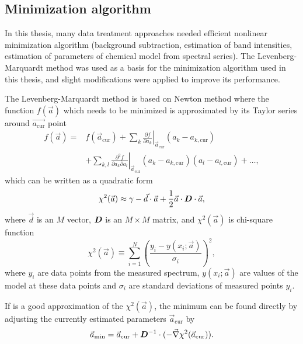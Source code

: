\subsection{Minimization algorithm}
\label{minimization}

In this thesis, many data treatment approaches needed efficient nonlinear
minimization algorithm (background subtraction, estimation of band intensities,
estimation of parameters of chemical model from spectral series).
The Levenberg-Marquardt method
\parencite{Marquardt1963}
was used as a basis for the minimization algorithm used in this thesis, and
slight modifications were applied to improve its performance.

The Levenberg-Marquardt method is based on Newton method where
the function $f(\vec{a})$ which needs to be minimized is approximated by its
Taylor series around $\vec{a_\text{cur}}$ point
\begin{align*}
	f(\vec{a}) =& f(\vec{a}_\text{cur})
		+ \sum_k \left.\frac{\partial{}f}{\partial{}a_k}\right
			\rvert_{\vec{a}_\text{cur}}(a_k - a_{k,\text{cur}})\\
		&+ \sum_{k,l} \left.\frac{
			\partial^2f
		}{
			\partial{}a_k\partial{}a_l
		}\right\rvert_{\vec{a}_\text{cur}}
		(a_k - a_{k,\text{cur}})(a_l - a_{l,\text{cur}})
		+ \dots,
\end{align*}
which can be written as a quadratic form
\begin{equation}
	\chi^2(\vec{a}) \approx
		\gamma
		- \vec{d}\cdot\vec{a}
		+ \frac{1}{2}\vec{a}\cdot{}\mat{D}\cdot\vec{a},
	\label{\eqnlabel{minimization:chi_approx}}
\end{equation}
where $\vec{d}$ is an $M$ vector, $\bm{D}$ is an $M\times{}M$ matrix, and
$\chi^2(\vec{a})$ is chi-square function
\begin{equation*}
	\chi^2(\vec{a}) \equiv \sum_{i=1}^N\left(
			\frac{y_i - y(x_i;\vec{a})}{\sigma_i}
	\right)^2,
\end{equation*}
where $y_i$ are data points from the measured spectrum,
$y(x_i;\vec{a})$ are values of the model at these data points and
$\sigma_i$ are standard deviations of measured points $y_i$.

If
is a good approximation of the $\chi^2(\vec{a})$, the minimum can be found
directly by adjusting the currently estimated parameters $\vec{a}_\text{cur}$
by
\begin{equation}
	\vec{a}_\text{min} = \vec{a}_\text{cur}
		+ \mat{D}^{-1}\cdot(-\vec{\nabla}\chi^2(\vec{a}_\text{cur})).
	\label{\eqnlabel{minimization:newton_min}}
\end{equation}

